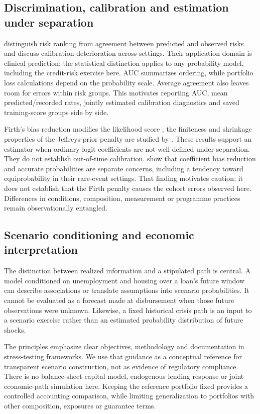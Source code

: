 \subsection{Discrimination, calibration and estimation under separation}
\citet{vancalster2019} distinguish risk ranking from agreement between predicted and observed risks and discuss calibration deterioration across settings. Their application domain is clinical prediction; the statistical distinction applies to any probability model, including the credit-risk exercise here. AUC summarizes ordering, while portfolio loss calculations depend on the probability scale. Average agreement also leaves room for errors within risk groups. This motivates reporting AUC, mean predicted/recorded rates, jointly estimated calibration diagnostics and saved training-score groups side by side.

Firth's bias reduction modifies the likelihood score \citep{firth1993}; the finiteness and shrinkage properties of the Jeffreys-prior penalty are studied by \citet{kosmidis2021}. These results support an estimator when ordinary-logit coefficients are not well defined under separation. They do not establish out-of-time calibration. \citet{puhr2017} show that coefficient bias reduction and accurate probabilities are separate concerns, including a tendency toward equiprobability in their rare-event settings. That finding motivates caution; it does not establish that the Firth penalty causes the cohort errors observed here. Differences in conditions, composition, measurement or programme practices remain observationally entangled.

\subsection{Scenario conditioning and economic interpretation}
The distinction between realized information and a stipulated path is central. A model conditioned on unemployment and housing over a loan's future window can describe associations or translate assumptions into scenario probabilities. It cannot be evaluated as a forecast made at disbursement when those future observations were unknown. Likewise, a fixed historical crisis path is an input to a scenario exercise rather than an estimated probability distribution of future shocks.

The \citet{bcbs2018} principles emphasize clear objectives, methodology and documentation in stress-testing frameworks. We use that guidance as a conceptual reference for transparent scenario construction, not as evidence of regulatory compliance. There is no balance-sheet capital model, endogenous lending response or joint economic-path simulation here. Keeping the reference portfolio fixed provides a controlled accounting comparison, while limiting generalization to portfolios with other composition, exposures or guarantee terms.

